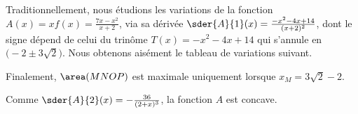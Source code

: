 Traditionnellement, nous étudions les variations de la fonction
$A(x) = x f(x) = \frac{7 x - x^2}{x + 2}$, via sa dérivée
$\sder{A}{1}(x) = \frac{- x^2 - 4 x + 14}{(x + 2)^2}$, dont le signe dépend de celui du trinôme $T(x) = - x^2 - 4 x + 14$ qui s'annule en $\big( - 2 \pm 3 \sqrt{2} \big)$.
Nous obtenons aisément le tableau de variations suivant.
%
\begin{center}
\end{center}


Finalement,
$\area(MNOP)$ est maximale uniquement lorsque $x_M = 3 \sqrt{2} - 2$.


\begin{remark}
	Comme
	$\sder{A}{2}(x) = - \frac{36}{(2 + x)^3}$,
	la fonction $A$ est concave.
\end{remark}
